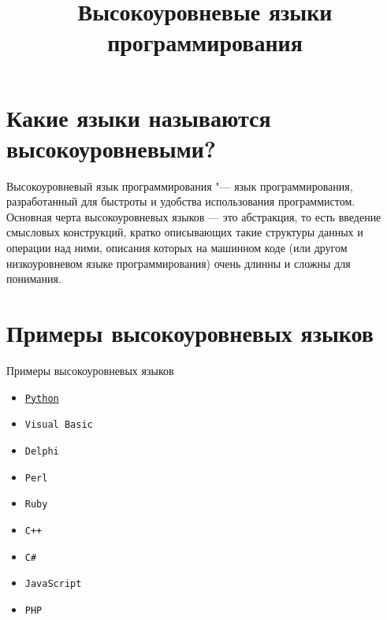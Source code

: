 \documentclass[14pt]{beamer}
\title{Высокоуровневые языки программирования}
\date{}
\begin{document}
\begin{frame}[plain]
\titlepage
\end{frame}

{\section{Какие языки называются высокоуровневыми?}
\begin{frame}
\begin{block}{Высокоуровневый язык программирования "---}
язык программирования, разработанный для быстроты и удобства использования программистом. Основная черта высокоуровневых языков — это абстракция, то есть введение смысловых конструкций, кратко описывающих такие структуры данных и операции над ними, описания которых на машинном коде (или другом низкоуровневом языке программирования) очень длинны и сложны для понимания.
\end{block}
\end{frame}
}

{
\section{Примеры высокоуровневых языков}
\begin{frame}[label=menu]
\begin{alertblock}{Примеры высокоуровневых языков}
\begin{itemize}

\item \hyperlink{Python}{\texttt{Python}}
\item \texttt{Visual Basic}
\item \texttt{Delphi}
\item \texttt{Perl}
\item \texttt{Ruby}
\item \texttt{C++}
\item \texttt{C\#}
\item \texttt{JavaScript}
\item \texttt{PHP}

\end{itemize}
\end{alertblock}
\end{frame}
}
\end{document}
